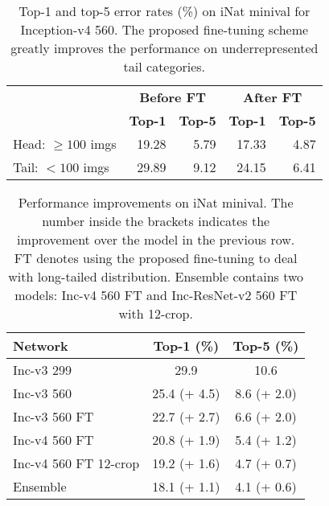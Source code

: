 \documentclass[10pt,twocolumn,letterpaper]{article}
\begin{document}
\begin{table}[t]
\small
\begin{center}
\begin{tabular}{ l|r|r|r|r }
\hline
& \multicolumn{2}{c|}{\textbf{Before FT}} & \multicolumn{2}{c}{\textbf{After FT}} \\ \cline{2-5}
& \textbf{Top-1} & \textbf{Top-5} & \textbf{Top-1} & \textbf{Top-5} \\ \hline
Head: $\geq 100$ imgs & 19.28 & 5.79 & 17.33 & 4.87 \\
Tail: $< 100$ imgs & 29.89 & 9.12 & 24.15 & 6.41 \\ \hline
\end{tabular}
\end{center}
\caption{Top-1 and top-5 error rates (\%) on iNat minival for Inception-v4 560. The proposed fine-tuning scheme greatly improves the performance on underrepresented tail categories.}
\label{tab:long-tailed}
\end{table}


\begin{table}[t]
\small
\begin{center}
\begin{tabular}{ l|c|c }\hline 
{\bf Network} & {\bf Top-1 (\%)} & {\bf Top-5 (\%)} \\ \hline
Inc-v3 299    & 29.9 & 10.6 \\
Inc-v3 560    & 25.4 (+ 4.5) & 8.6 (+ 2.0) \\
Inc-v3 560 FT & 22.7 (+ 2.7) & 6.6 (+ 2.0) \\
Inc-v4 560 FT & 20.8 (+ 1.9) & 5.4 (+ 1.2) \\
Inc-v4 560 FT 12-crop & 19.2 (+ 1.6) & 4.7 (+ 0.7) \\
Ensemble     & 18.1 (+ 1.1) & 4.1 (+ 0.6) \\ \hline 
\end{tabular}
\end{center}
\caption{Performance improvements on iNat minival. The number inside the brackets indicates the improvement over the model in the previous row. FT denotes using the proposed fine-tuning to deal with long-tailed distribution. Ensemble contains two models: Inc-v4 560 FT and Inc-ResNet-v2 560 FT with 12-crop.}
\label{tab:inat}
\end{table}
\end{document}
